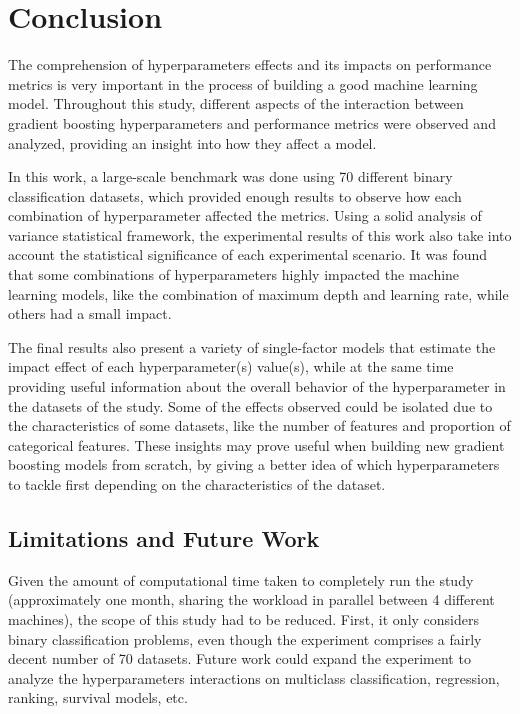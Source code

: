 \chapter{Conclusion}
\label{cap:conclusion}

The comprehension of hyperparameters effects and its impacts on performance metrics is very important in the process of building a good machine learning model. Throughout this study, different aspects of the interaction between gradient boosting hyperparameters and performance metrics were observed and analyzed, providing an insight into how they affect a model.

In this work, a large-scale benchmark was done using 70 different binary classification datasets, which provided enough results to observe how each combination of hyperparameter affected the metrics. Using a solid analysis of variance statistical framework, the experimental results of this work also take into account the statistical significance of each experimental scenario. It was found that some combinations of hyperparameters highly impacted the machine learning models, like the combination of maximum depth and learning rate, while others had a small impact. 

The final results also present a variety of single-factor models that estimate the impact effect of each hyperparameter(s) value(s), while at the same time providing useful information about the overall behavior of the hyperparameter in the datasets of the study. Some of the effects observed could be isolated due to the characteristics of some datasets, like the number of features and proportion of categorical features. These insights may prove useful when building new gradient boosting models from scratch, by giving a better idea of which hyperparameters to tackle first depending on the characteristics of the dataset.

\section{Limitations and Future Work}

Given the amount of computational time taken to completely run the study (approximately one month, sharing the workload in parallel between 4 different machines), the scope of this study had to be reduced. First, it only considers binary classification problems, even though the experiment comprises a fairly decent number of 70 datasets. Future work could expand the experiment to analyze the hyperparameters interactions on multiclass classification, regression, ranking, survival models, etc.

